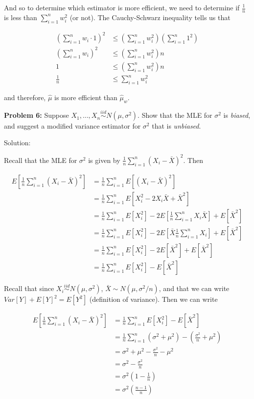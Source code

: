 \documentclass[
  letterpaper,
  DIV=11,
  numbers=noendperiod]{scrreprt}
\begin{document}
And so to determine which estimator is more efficient, we need to
determine if \(\frac{1}{n}\) is less than \(\sum_{i = 1}^n w_i^2\) (or
not). The Cauchy-Schwarz inequality tells us that

\begin{align*}
    \left( \sum_{i = 1}^n w_i \cdot 1\right)^2 & \leq \left( \sum_{i = 1}^n w_i^2 \right) \left( \sum_{i = 1}^n 1^2 \right) \\
    \left( \sum_{i = 1}^n w_i \right)^2 & \leq \left( \sum_{i = 1}^n w_i^2 \right) n \\
    1 & \leq \left( \sum_{i = 1}^n w_i^2 \right) n  \\
    \frac{1}{n} & \leq \sum_{i = 1}^n w_i^2
\end{align*}

and therefore, \(\hat{\mu}\) is more efficient than \(\hat{\mu}_w\).

\textbf{Problem 6:} Suppose
\(X_1, \dots, X_n \overset{iid}{\sim} N(\mu, \sigma^2)\). Show that the
MLE for \(\sigma^2\) is \emph{biased}, and suggest a modified variance
estimator for \(\sigma^2\) that is \emph{unbiased}.

Solution:

Recall that the MLE for \(\sigma^2\) is given by
\(\frac{1}{n} \sum_{i = 1}^n (X_i - \bar{X})^2\). Then

\begin{align*}
    E\left[ \frac{1}{n} \sum_{i = 1}^n (X_i - \bar{X})^2\right] & = \frac{1}{n} \sum_{i = 1}^n E\left[ (X_i - \bar{X})^2\right] \\
    & = \frac{1}{n} \sum_{i = 1}^n E\left[ X_i^2 - 2X_i \bar{X} + \bar{X}^2\right] \\
    & = \frac{1}{n} \sum_{i = 1}^n E[X_i^2] - 2 E\left[ \frac{1}{n} \sum_{i = 1}^n X_i \bar{X} \right] + E[\bar{X}^2] \\
    & = \frac{1}{n} \sum_{i = 1}^n E[X_i^2] - 2 E\left[ \bar{X} \frac{1}{n} \sum_{i = 1}^n X_i  \right] + E[\bar{X}^2] \\
    & = \frac{1}{n} \sum_{i = 1}^n E[X_i^2] - 2 E\left[ \bar{X}^2  \right] + E[\bar{X}^2] \\
    & = \frac{1}{n} \sum_{i = 1}^n E[X_i^2] - E\left[ \bar{X}^2  \right] 
\end{align*}

Recall that since \(X_i \overset{iid}{\sim} N(\mu, \sigma^2)\),
\(\bar{X} \sim N(\mu, \sigma^2/n)\), and that we can write
\(Var[Y] + E[Y]^2 = E[Y^2]\) (definition of variance). Then we can write

\begin{align*}
    E\left[ \frac{1}{n} \sum_{i = 1}^n (X_i - \bar{X})^2 \right] & = \frac{1}{n} \sum_{i = 1}^n E[X_i^2] - E\left[ \bar{X}^2  \right] \\
    & = \frac{1}{n} \sum_{i = 1}^n \left( \sigma^2 + \mu^2 \right) - \left( \frac{\sigma^2}{n} + \mu^2 \right) \\
    & = \sigma^2 + \mu^2 - \frac{\sigma^2}{n} - \mu^2  \\
    & = \sigma^2 - \frac{\sigma^2}{n} \\
    & = \sigma^2 \left( 1 - \frac{1}{n} \right) \\
    & = \sigma^2  \left( \frac{n-1}{n} \right)
\end{align*}
\end{document}
